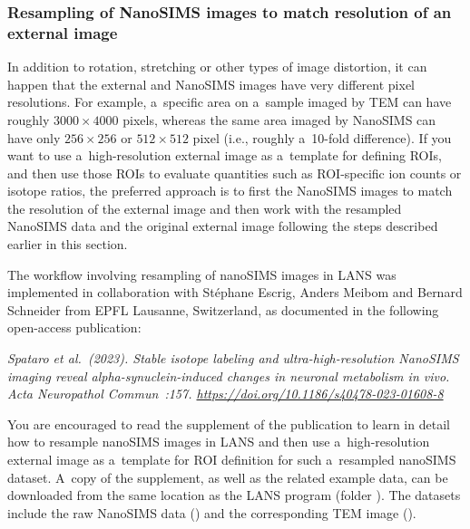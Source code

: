 

\subsubsection{Resampling of NanoSIMS images to match resolution of an external image}
\setcounter{step}{0}

\goldbox{}
In addition to rotation, stretching or other types of image distortion, it can happen that the external and NanoSIMS images have very different pixel resolutions. For example, a~specific area on a~sample imaged by TEM can have roughly $3000\times 4000$ pixels, whereas the same area imaged by NanoSIMS can have only $256\times 256$ or $512\times 512$ pixel (i.e., roughly a~10-fold difference). If you want to use a~high-resolution external image as a~template for defining ROIs, and then use those ROIs to evaluate quantities such as ROI-specific ion counts or isotope ratios, the preferred approach is to first  the NanoSIMS images to match the resolution of the external image and then work with the resampled NanoSIMS data and the original external image following the steps described earlier in this section.
\tcbe

The workflow involving resampling of nanoSIMS images in LANS was implemented in collaboration with St\'ephane Escrig, Anders Meibom and Bernard Schneider from EPFL Lausanne, Switzerland, as documented in the following open-access publication:
\skybluebox{}
\vskip0.5mm
\begin{center}
\begin{minipage}{0.93\textwidth}
\textsl{\small Spataro et al.~(2023). Stable isotope labeling and ultra-high-resolution NanoSIMS imaging reveal alpha-synuclein-induced changes in neuronal metabolism in vivo. \emph{Acta Neuro\-pathol Commun}~:157. \url{https://doi.org/10.1186/s40478-023-01608-8}}
\end{minipage}
\end{center}
\tcbe

\noindent 
You are encouraged to read the supplement of the publication to learn in detail how to resample nanoSIMS images in LANS and then use a~high-resolution external image as a~template for ROI definition for such a~resampled nanoSIMS dataset. A~copy of the supplement, as well as the related example data, can be downloaded from the same location as the LANS program (folder ). The datasets include the raw NanoSIMS data () and the corresponding TEM image (). 
